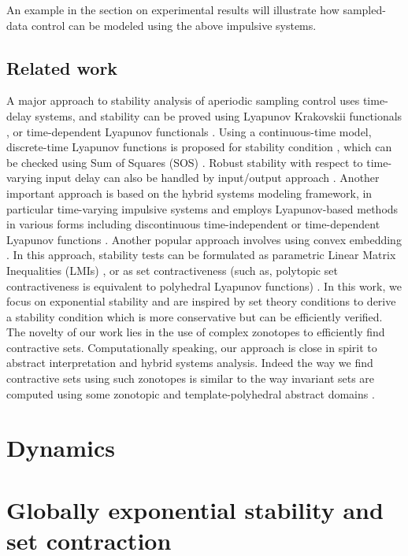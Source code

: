 
An example in the section on experimental results will illustrate how
sampled-data control can be modeled using the above impulsive systems.

\subsection*{Related work} 
A major approach to stability analysis of aperiodic sampling control uses time-delay 
systems, and stability can be proved using Lyapunov Krakovskii functionals 
\cite{Mikheev1988,Teel1998,2010-liu-stability,Mazenc2013}, 
or time-dependent Lyapunov functionals \cite{2010-fridman-refined}. Using a continuous-time model,  
discrete-time Lyapunov functions is proposed for stability condition \cite{2012-seuret-novel}, 
which can be checked using Sum of Squares (SOS) \cite{2013-seuret-stability}. Robust stability with respect to 
time-varying input delay can also be handled by input/output approach 
\cite{Mirkin2007,DBLP:journals/automatica/Fujioka09,DBLP:conf/amcc/KaoW14,Omran2013,Omran2014}.
Another important approach is based on the hybrid systems modeling framework, in particular time-varying impulsive systems 
\cite{Hu2003,nevsic2004framework,Goebel2009,Cai 2008,BauLoo_NECSYS12a} and employs Lyapunov-based 
methods in various forms including discontinuous time-independent \cite{2008-naghshtabrizi-exponential} 
or time-dependent Lyapunov functions \cite{2010-fridman-refined}. Another popular 
approach involves using convex embedding \cite{HetelDaafouz2006,Fujioka2009,HetelKruszewski2011,2013hetel,Omran2014}. 
In this approach, stability tests can be formulated as parametric Linear Matrix Inequalities (LMIs) \cite{HetelDaafouz2006}, 
or as set contractiveness (such as, polytopic set contractiveness is equivalent to polyhedral Lyapunov 
functions) \cite{2014-fiacchini-set,2013-briat-convex,Lazar2013,athanasopoulos2014alternative,AlKhatib2015}. 
In this work, we focus on exponential stability and are inspired by
set theory conditions
\cite{2014-fiacchini-set,athanasopoulos2014alternative,AlKhatib2015} to derive a stability condition which is more conservative 
but can be efficiently verified. The novelty of our work lies in the use of complex zonotopes to efficiently 
find contractive sets. Computationally speaking, our approach is close in spirit to abstract interpretation
and hybrid systems analysis. Indeed the way we find contractive sets using such zonotopes is similar 
to the way invariant sets are computed using some zonotopic
\cite{Girard05reachabilityof,Althoff2011,DBLP:conf/sas/GoubaultPV12} and
template-polyhedral abstract domains \cite{S riram2008,jeannet2009apron}.



\section{Dynamics}


\section{Globally exponential stability and set contraction}

